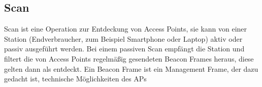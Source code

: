 \subsection{Scan}
Scan ist eine Operation zur Entdeckung von Access Points, sie kann von einer Station (Endverbraucher, zum Beispiel Smartphone oder Laptop) aktiv oder passiv ausgeführt werden.
Bei einem passiven Scan empfängt die Station und filtert die von Access Points regelmäßig gesendeten Beacon Frames heraus, diese gelten dann als entdeckt.
Ein Beacon Frame ist ein Management Frame, der dazu gedacht ist, technische Möglichkeiten des APs 
